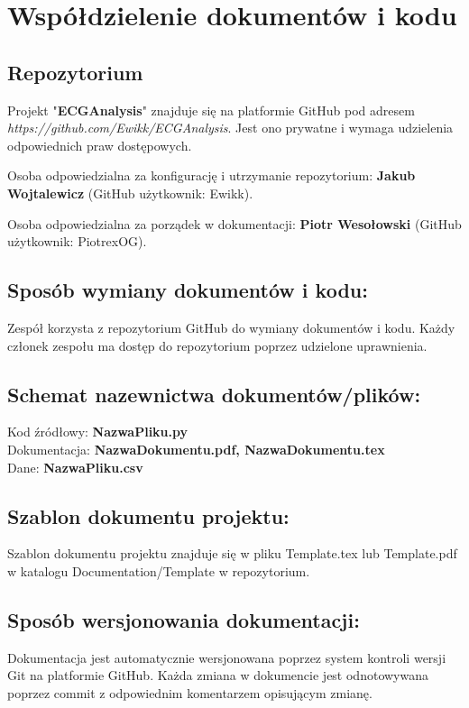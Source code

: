 \documentclass[12pt]{article}
\begin{document}
    \section{Współdzielenie dokumentów i kodu }
            
        \subsection*{Repozytorium}
            Projekt "\textbf{ECGAnalysis}" znajduje się na platformie GitHub pod adresem \textit{https://github.com/Ewikk/ECGAnalysis}. Jest ono prywatne i wymaga udzielenia odpowiednich praw dostępowych. 

            Osoba odpowiedzialna za konfigurację i utrzymanie repozytorium: \textbf{Jakub Wojtalewicz} (GitHub użytkownik: Ewikk). 

            Osoba odpowiedzialna za porządek w dokumentacji: \textbf{Piotr Wesołowski} (GitHub użytkownik: PiotrexOG). 


        \subsection*{Sposób wymiany dokumentów i kodu:} 
            Zespół korzysta z repozytorium GitHub do wymiany dokumentów i kodu. Każdy członek zespołu ma dostęp do repozytorium poprzez udzielone uprawnienia. 

        \subsection*{Schemat nazewnictwa dokumentów/plików:}
            Kod źródłowy: \textbf{NazwaPliku.py} \\
            Dokumentacja: \textbf{NazwaDokumentu.pdf, NazwaDokumentu.tex}\\
            Dane: \textbf{NazwaPliku.csv}

        \subsection*{Szablon dokumentu projektu:}
            Szablon dokumentu projektu znajduje się w pliku Template.tex lub Template.pdf w katalogu Documentation/Template w repozytorium. 

        \subsection*{Sposób wersjonowania dokumentacji:} 
            Dokumentacja jest automatycznie wersjonowana poprzez system kontroli wersji Git na platformie GitHub. Każda zmiana w dokumencie jest odnotowywana poprzez commit z odpowiednim komentarzem opisującym zmianę. 
\end{document}

